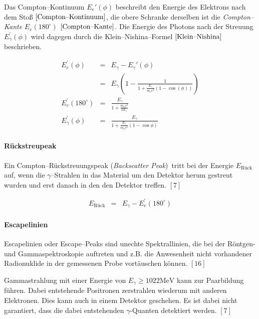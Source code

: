 \documentclass[12pt,a4paper]{scrartcl}
\numberwithin{equation}{section} %
\newcommand{\pu}[1]{\ensuremath{\mathrm{#1}}}
\begin{document}
Das Compton--Kontinuum $E_e'(\phi)$ beschreibt den Energie des Elektrons nach dem Stoß $\eqref{Compton--Kontinuum}$, die obere Schranke derselben ist die \emph{Compton--Kante} $E_e(180^\circ)$ $\eqref{Compton--Kante}$. Die Energie des Photons nach der Streuung $E_{\gamma}^\prime(\phi)$ wird dagegen durch die Klein--Nishina--Formel $\eqref{Klein--Nishina}$ beschrieben.

\begin{eqnarray}
    E_e^\prime(\phi)
        &=& E_{\gamma} - E_{\gamma}'(\phi) \\
        &=& E_{\gamma}
            \left(
                1-
                \frac{1}{1+\frac{E_{\gamma}}{m_\mathrm ec^2}
                    (1-\cos(\phi))}
            \right) \label{Compton--Kontinuum} \\
    E_e^\prime(180^\circ) &=& \frac{E_\gamma}{1+\frac{m_ec^2}{2E_\gamma}}
        \label{Compton--Kante} \\
    E_{\gamma}^\prime(\phi)
        &=& \frac{E_{\gamma}}{1+\frac{E_{\gamma}}{m_\mathrm ec^2}
            (1-\cos\phi)} \label{Klein--Nishina}
\end{eqnarray}

\paragraph{Rückstreupeak}

Ein Compton--Rückstreuungspeak (\emph{Backscatter Peak})~tritt bei der Energie $E_\mathrm{Rück}$ auf, wenn die $\gamma$--Strahlen in das Material um den Detektor herum gestreut wurden und erst danach in den
den Detektor treffen. $[7]$

\begin{eqnarray}
    E_\mathrm{Rück} &=& E_\gamma - E_e^\prime(180^\circ)
\end{eqnarray}

\paragraph{Escapelinien}

Escapelinien oder Escape--Peaks sind unechte Spektrallinien, die bei der Röntgen- und Gammaspektroskopie auftreten und z.B. die Anwesenheit nicht vorhandener Radionuklide in der gemessenen Probe vortäuschen können. $[16]$

Gammastrahlung mit einer Energie von $E_\gamma\ge\pu{1022MeV}$ kann zur Paarbildung führen. Dabei entstehende Positronen zerstrahlen wiederum mit anderen Elektronen. Dies kann auch in einem Detektor geschehen. Es ist dabei nicht garantiert, dass die dabei entstehenden $\gamma$-Quanten detektiert werden. $[7]$
\end{document}
